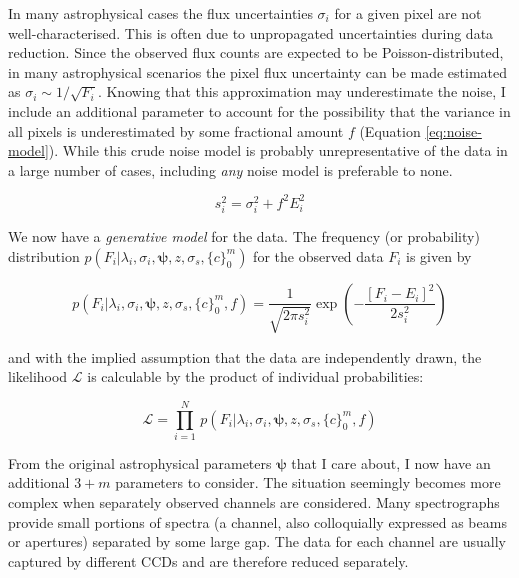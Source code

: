 \documentclass[iop]{emulateapj}
\begin{document}
In many astrophysical cases the flux uncertainties $\sigma_{i}$ for a given pixel 
are not well-characterised. This is often due to unpropagated uncertainties during 
data reduction. Since the observed flux counts are expected to be Poisson-distributed, 
in many astrophysical scenarios the pixel flux uncertainty can be made estimated 
as $\sigma_i \sim 1/\sqrt{F_{i}}$. Knowing that this approximation may underestimate 
the noise, I include an additional parameter to account for the possibility that 
the variance in all pixels is underestimated by some fractional amount $f$ 
(Equation \ref{eq:noise-model}). While this crude noise model is probably 
unrepresentative of the data in a large number of cases, including \textit{any} 
noise model is preferable to none.

\begin{equation}
s_{i}^2 = \sigma_{i}^2 + f^{2}E_{i}^2
\label{eq:noise-model}
\end{equation}

We now have a \textit{generative model} for the data. The frequency (or 
probability) distribution ${p\left(F_i|\lambda_i,\sigma_i,\bm{\psi},z,\sigma_s,\{c\}_{0}^{m}\right)}$ 
for the observed data $F_i$ is given by

\begin{equation}
p\left(F_i|\lambda_i,\sigma_{i},\bm{\psi},z,\sigma_{s},\{c\}_{0}^{m},f\right) = 
 \frac{1}{\sqrt{2\pi{}s_{i}^2}}\exp{\left(-\frac{\left[F_i - E_i\right]^2}{2s_{i}^2}\right)}
 \label{eq:p_model}
\end{equation}

\noindent{}and with the implied assumption that the data are independently drawn,
the likelihood $\mathcal{L}$ is calculable by the product of individual probabilities:

\begin{equation}
\mathcal{L} = \prod_{i=1}^{N}\,p\left(F_i|\lambda_i,\sigma_{i},\bm{\psi},z,\sigma_{s},\{c\}_{0}^{m},f\right)
\end{equation}

From the original astrophysical parameters $\bm{\psi}$ that I care about, I now 
have an additional $3 + m$ parameters to consider. The situation seemingly becomes 
more complex when separately observed channels are considered. Many spectrographs 
provide small portions of spectra (a channel, also colloquially expressed as beams 
or apertures) separated by some large gap. The data for each channel are usually 
captured by different CCDs and are therefore reduced separately. 
\end{document}
